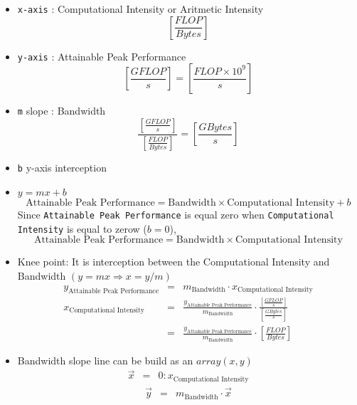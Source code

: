 \documentclass{article}
\begin{document}
\begin{itemize}
\item \verb+x-axis+ : Computational Intensity or Aritmetic Intensity  \[\left[\frac{FLOP}{Bytes}\right]\]
\item \verb+y-axis+ : Attainable Peak Performance \[ \left[\frac{GFLOP}{s}\right] = \left[\frac{FLOP \times 10^9}{s}\right] \]
\item \verb+m+ slope : Bandwidth \[ \displaystyle \frac{\left[\frac{GFLOP}{s}\right] } { \left[\frac{FLOP}{Bytes} \right] } = \left[ \frac{GBytes}{s}\right] \]
\item \verb+b+  y-axis interception
\item $y =  mx + b$
\begin{equation*}
\mbox{Attainable Peak Performance} =  \mbox{Bandwidth} \times \mbox{Computational Intensity} + b
\end{equation*}
Since \verb+Attainable Peak Performance+ is equal zero when \verb+Computational Intensity+ is equal to zerow  ($b = 0$),
\begin{equation*}
\mbox{Attainable Peak Performance} =  \mbox{Bandwidth} \times \mbox{Computational Intensity}
\end{equation*}

\item Knee point: It is interception between the Computational Intensity and Bandwidth $(y = mx \Rightarrow x = y/m)$
 \begin{eqnarray*}
y_{\mbox{Attainable Peak Performance}} & = &  m_{\mbox{Bandwidth}} \cdot x_{\mbox{Computational Intensity}}\\
x_{\mbox{Computational Intensity}} & = &\frac{y_{\mbox{Attainable Peak Performance}}}{m_{\mbox{Bandwidth}}} \cdot \frac{\left[\frac{GFLOP}{s}\right]}{\left[\frac{GBytes}{s}\right]}\\
& = &\frac{y_{\mbox{Attainable Peak Performance}}}{m_{\mbox{Bandwidth}}} \cdot \left[\frac{FLOP}{Bytes}\right]
\end{eqnarray*}
\item Bandwidth slope line can be build as an $ array(x, y)$
\begin{eqnarray*}
\vec{x} & = &  0 : x_{\mbox{Computational Intensity}}
\end{eqnarray*}
\begin{eqnarray*}
\vec{y} & = & m_{\mbox{Bandwidth}}  \cdot  \vec{x}
\end{eqnarray*}
\end{itemize}
\end{document}
